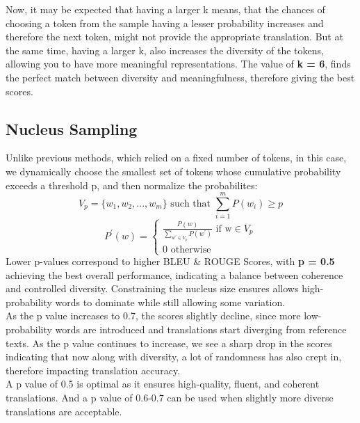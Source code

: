 \documentclass{article}
\begin{document}
Now, it may be expected that having a larger k means, that the chances of choosing a token from the sample having a lesser probability increases and therefore the next token, might not provide the appropriate translation. But at the same time, having a larger k, also increases the diversity of the tokens, allowing you to have more meaningful representations. The value of \textbf{k = 6}, finds the perfect match between diversity and meaningfulness, therefore giving the best scores.

\newpage
\subsection{Nucleus Sampling}
Unlike previous methods, which relied on a fixed number of tokens, in this case, we dynamically choose the smallest set of tokens whose cumulative probability exceeds a threshold p, and then normalize the probabilites:
\[
    V_p = \{w_1, w_2, ..., w_m\}\text{ such that }\sum_{i=1}^{m}P(w_i) \ge p
\]
\[
    P^{'}(w) = 
    \begin{cases}
    \frac{P(w)}{\sum_{w^{'}\in V_p} P(w^{'})} \text{ if w} \in V_p\\
    0 \text{ otherwise}
    \end{cases}
\]
Lower p-values correspond to higher BLEU \& ROUGE Scores, with \textbf{p = 0.5} achieving the best overall performance, indicating a balance between coherence and controlled diversity. Constraining the nucleus size ensures allows high-probability words to dominate while still allowing some variation.\\
As the p value increases to 0.7, the scores slightly decline, since more low-probability words are introduced and translations start diverging from reference texts. As the p value continues to increase, we see a sharp drop in the scores indicating that now along with diversity, a lot of randomness has also crept in, therefore impacting translation accuracy.\\
A p value of 0.5 is optimal as it ensures high-quality, fluent, and coherent translations. And a p value of 0.6-0.7 can be used when slightly more diverse translations are acceptable.
\end{document}
